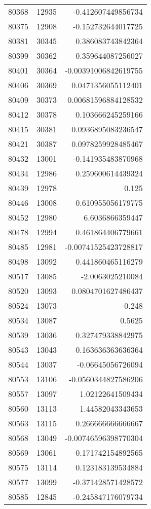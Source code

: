 \begin{tabular}{r | r | r}
80368 & 12935 & -0.412607449856734 \\
80375 & 12908 & -0.152732644017725 \\
80381 & 30345 & 0.386083743842364 \\
80399 & 30362 & 0.359644087256027 \\
80401 & 30364 & -0.00391006842619755 \\
80406 & 30369 & 0.0471356055112401 \\
80409 & 30373 & 0.00681596884128532 \\
80412 & 30378 & 0.103666245259166 \\
80415 & 30381 & 0.0936895083236547 \\
80421 & 30387 & 0.0978259928485467 \\
80432 & 13001 & -0.141935483870968 \\
80434 & 12986 & 0.259600614439324 \\
80439 & 12978 & 0.125 \\
80446 & 13008 & 0.610955056179775 \\
80452 & 12980 & 6.6036866359447 \\
80478 & 12994 & 0.461864406779661 \\
80485 & 12981 & -0.00741525423728817 \\
80498 & 13092 & 0.441860465116279 \\
80517 & 13085 & -2.0063025210084 \\
80520 & 13093 & 0.0804701627486437 \\
80524 & 13073 & -0.248 \\
80534 & 13087 & 0.5625 \\
80539 & 13036 & 0.327479338842975 \\
80543 & 13043 & 0.163636363636364 \\
80544 & 13037 & -0.06645056726094 \\
80553 & 13106 & -0.0560344827586206 \\
80557 & 13097 & 1.02122641509434 \\
80560 & 13113 & 1.44582043343653 \\
80563 & 13115 & 0.266666666666667 \\
80568 & 13049 & -0.00746596398770304 \\
80569 & 13061 & 0.171742154892565 \\
80575 & 13114 & 0.123183139534884 \\
80577 & 13099 & -0.371428571428572 \\
80585 & 12845 & -0.245847176079734 \\

\end{tabular}
